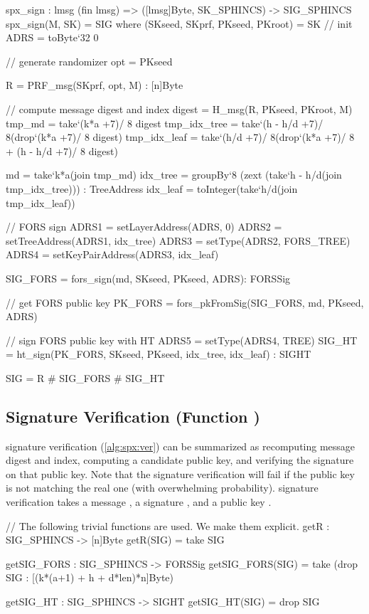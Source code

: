 \begin{code}
  spx_sign : {lmsg} (fin lmsg) => ([lmsg]Byte, SK_SPHINCS) -> SIG_SPHINCS
  spx_sign(M, SK) = SIG where
    (SKseed, SKprf, PKseed, PKroot) = SK
    // init
    ADRS = toByte`{32} 0

    // generate randomizer
    opt = PKseed

    R = PRF_msg(SKprf, opt, M) : [n]Byte

    // compute message digest and index
    digest = H_msg(R, PKseed, PKroot, M)
    tmp_md =
      take`{(k*a +7)/ 8} digest
    tmp_idx_tree =
      take`{(h - h/d +7)/ 8}(drop`{(k*a +7)/ 8} digest)
    tmp_idx_leaf =
      take`{(h/d +7)/ 8}(drop`{(k*a +7)/ 8 + (h - h/d +7)/ 8} digest)

    md = take`{k*a}(join tmp_md)
    idx_tree =
      groupBy`{8} (zext (take`{h - h/d}(join tmp_idx_tree))) : TreeAddress
    idx_leaf = toInteger(take`{h/d}(join tmp_idx_leaf))

    // FORS sign
    ADRS1 = setLayerAddress(ADRS, 0)
    ADRS2 = setTreeAddress(ADRS1, idx_tree)
    ADRS3 = setType(ADRS2, FORS_TREE)
    ADRS4 = setKeyPairAddress(ADRS3, idx_leaf)

    SIG_FORS = fors_sign(md, SKseed, PKseed, ADRS): FORSSig

    // get FORS public key
    PK_FORS = fors_pkFromSig(SIG_FORS, md, PKseed, ADRS)

    // sign FORS public key with HT
    ADRS5 = setType(ADRS4, TREE)
    SIG_HT = ht_sign(PK_FORS, SKseed, PKseed, idx_tree, idx_leaf) : SIGHT

    SIG = R # SIG_FORS # SIG_HT
\end{code}

\subsection{\spx Signature Verification (Function \spxverify)}

   \spx signature verification (\autoref{alg:spx:ver}) can be summarized as
   recomputing message digest and index, computing a candidate \fors public key,
   and verifying the \hyper signature on that public key. Note that the \hyper
   signature verification will fail if the \fors public key is not matching the
   real one (with overwhelming probability). \spx signature verification takes
   a message \msg, a signature \spxsig, and a \spx public key \PK.

\begin{code}
  // The following trivial functions are used. We make them explicit.
  getR : SIG_SPHINCS -> [n]Byte
  getR(SIG) = take SIG

  getSIG_FORS : SIG_SPHINCS -> FORSSig
  getSIG_FORS(SIG) = take (drop SIG : [(k*(a+1) + h + d*len)*n]Byte)

  getSIG_HT : SIG_SPHINCS -> SIGHT
  getSIG_HT(SIG) = drop SIG
\end{code}

